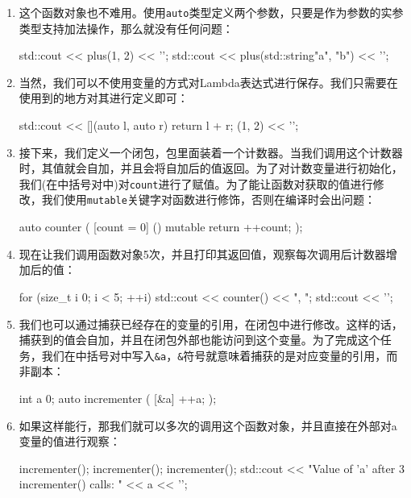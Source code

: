 \begin{enumerate}
\item 这个函数对象也不难用。使用\texttt{auto}类型定义两个参数，只要是作为参数的实参类型支持加法操作，那么就没有任何问题：

\begin{codebox}[cpp]
std::cout << plus(1, 2) << '\n';
std::cout << plus(std::string{"a"}, "b") << '\n';
\end{codebox}

\item 当然，我们可以不使用变量的方式对Lambda表达式进行保存。我们只需要在使用到的地方对其进行定义即可：

\begin{codebox}[cpp]
std::cout
    << [](auto l, auto r){ return l + r; }(1, 2)
    << '\n';
\end{codebox}

\item 接下来，我们定义一个闭包，包里面装着一个计数器。当我们调用这个计数器时，其值就会自加，并且会将自加后的值返回。为了对计数变量进行初始化，我们(在中括号对中)对\texttt{count}进行了赋值。为了能让函数对获取的值进行修改，我们使用\texttt{mutable}关键字对函数进行修饰，否则在编译时会出问题：

\begin{codebox}[cpp]
auto counter (
    [count = 0] () mutable { return ++count; }
);
\end{codebox}

\item 现在让我们调用函数对象5次，并且打印其返回值，观察每次调用后计数器增加后的值：

\begin{codebox}[cpp]
for (size_t i {0}; i < 5; ++i) {
    std::cout << counter() << ", ";
}
std::cout << '\n';
\end{codebox}

\item 我们也可以通过捕获已经存在的变量的引用，在闭包中进行修改。这样的话，捕获到的值会自加，并且在闭包外部也能访问到这个变量。为了完成这个任务，我们在中括号对中写入\texttt{\&a}，\texttt{\&}符号就意味着捕获的是对应变量的引用，而非副本：

\begin{codebox}[cpp]
int a {0};
auto incrementer ( [&a] { ++a; } );
\end{codebox}

\item 如果这样能行，那我们就可以多次的调用这个函数对象，并且直接在外部对a变量的值进行观察：

\begin{codebox}[cpp]
    incrementer();
    incrementer();
    incrementer();
    std::cout
        << "Value of 'a' after 3 incrementer() calls: "
        << a << '\n';
\end{codebox}


\end{enumerate}
